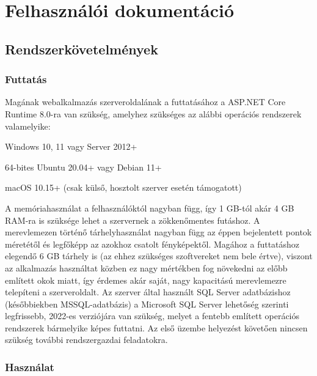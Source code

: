 \chapter{Felhasználói dokumentáció}
\label{ch:user}

\section{Rendszerkövetelmények}

\subsection{Futtatás}

Magának webalkalmazás szerveroldalának a futtatásához a ASP.NET Core Runtime 8.0-ra van szükség, amelyhez
szükséges az alábbi operációs rendszerek valamelyike:
\begin{compactitem}
	\item Windows 10, 11 vagy Server 2012+ \cite{install-dotnet-windows}
	\item 64-bites Ubuntu 20.04+ vagy Debian 11+ \cite{install-dotnet-linux}
	\item macOS 10.15+ (csak külső, hosztolt szerver esetén támogatott) \cite{install-dotnet-mac}
\end{compactitem} 
A memóriahasználat a felhasználóktól nagyban függ, így 1 GB-tól akár 4 GB RAM-ra is szüksége lehet a szervernek a zökkenőmentes futáshoz. A merevlemezen történő tárhelyhasználat nagyban függ az éppen bejelentett pontok méretétől és legfőképp az azokhoz csatolt fényképektől. Magához a futtatáshoz elegendő 6 GB tárhely is (az ehhez szükséges szoftvereket nem bele értve), viszont az alkalmazás használtat közben ez nagy mértékben fog növekedni az előbb említett okok miatt, így érdemes akár saját, nagy kapacitású merevlemezre telepíteni a szerveroldalt.
Az szerver által használt SQL Server adatbázishoz (későbbiekben MSSQL-adatbázis) a Microsoft SQL Server lehetőség szerinti legfrissebb, 2022-es verziójára van szükség, melyet a fentebb említett operációs rendszerek bármelyike képes futtatni. \cite{sqlserver-requirements}
Az első üzembe helyezést követően nincsen szükség további rendszergazdai feladatokra.
\subsection{Használat}

